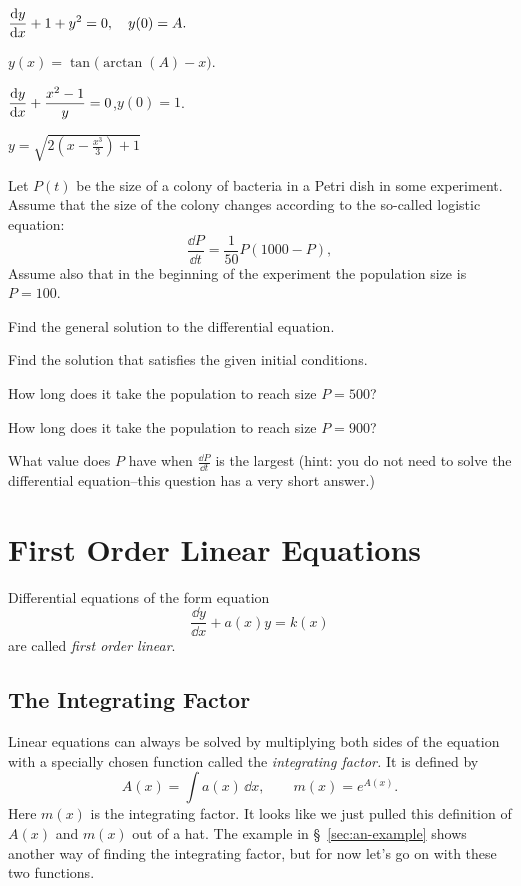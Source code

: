 \begin{multicols}{2}
\problem \(\displaystyle \frac{\mathrm{d} y}{\mathrm{d} x} + 1 + y^2 =0,\quad y(0)=A.  \) %

\answer %
$y(x) = \tan\bigl(\arctan (A) - x\bigr)$.
\endanswer


\problem $\displaystyle\frac{\mathrm{d} y}{\mathrm{d} x}+\frac{x^2-1}{y}=0$,\quad $y(0)=1$. %

\answer  %
$y=\sqrt{2(x-\frac{x^3}3)+1}$
\endanswer

\problem\groupproblem%
Let $P(t)$ be the size of a colony of bacteria in a Petri dish in some
experiment.  Assume that the size of the colony changes according to the
so-called logistic equation:
\[
\frac{\dd P} {\dd t} = \frac{1} {50} P(1000-P),
\]
Assume also that in the beginning of the experiment the population size is $P=100$.

\subprob Find the general solution to the differential equation.

\subprob Find the solution that satisfies the given initial conditions.

\subprob How long does it take the population to reach size $P=500$?

\subprob How long does it take the population to reach size $P=900$?

\subprob What value does $P$ have when $\frac{\dd P} {\dd t}$ is the largest (hint:
you do not need to solve the differential equation--this question has a very short
answer.)

\end{multicols}
\noproblemfont

\section{First Order Linear Equations} %
\label{sec:1storder-linear}
Differential equations of the form equation
\begin{equation}
  \frac{\dd y}{\dd x}+a(x)y = k(x)
  \label{eq:inhomogeneous-linear}
\end{equation}
are called \emph{first order linear}.  

\subsection{The Integrating Factor} %
\label{sec:integrating-factor}
Linear equations can always be solved by multiplying both sides of the equation
with a specially chosen function called the \emph{integrating factor.}  It is
defined by
\begin{equation}
  A (x) = \int a(x)\,\dd x,\qquad m (x) = e^{A (x)}.
  \label{eq:integrating-factor-defined}
\end{equation}
Here $m(x)$ is the integrating factor.  It looks like we just pulled this definition
of $A(x)$ and $m(x)$ out of a hat.  The example in \S~\ref{sec:an-example} shows
another way of finding the integrating factor, but for now let's go on with these two
functions.


